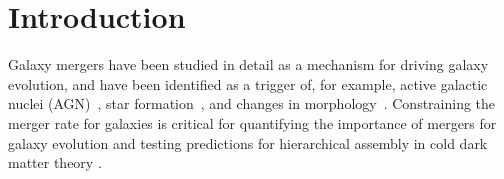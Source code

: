 \documentclass[linenumbers,twocolumn]{aastex631}
\begin{document}
\begin{abstract}
\end{abstract}

\section{Introduction} \label{sec:intro}
    Galaxy mergers have been studied in detail as a mechanism for driving galaxy evolution, and have been identified as a trigger of, for example, 
    active galactic nuclei (AGN)~\citep[e.g.][]{Hopkins2008,Treister2010,Ramos2011,Satyapal2014,Comerford2015,Glikman2015,Blecha2018,Ellison2019}, 
    star formation~\citep[e.g.][]{Mihos1996, DiMatteo2008,Ellison2011,Patton2013, Hopkins2013,Martin2017,Patton2020,Hani2020,Martin2021}, 
    and changes in morphology~\citep[e.g.][]{Conselice2003,Lotz2008,Casteels2014,Patton2016,Bignone2017,RG2017,Martin2018,Jackson2019,Snyder2019,Jackson2022,Guzman-Ortega2023}. 
    Constraining the merger rate for galaxies is critical for quantifying the importance of mergers for galaxy evolution and testing predictions for hierarchical assembly in cold dark matter theory \citep[e.g.][]{Stewart2009,Hopkins2010,RG2015}.
\end{document}
